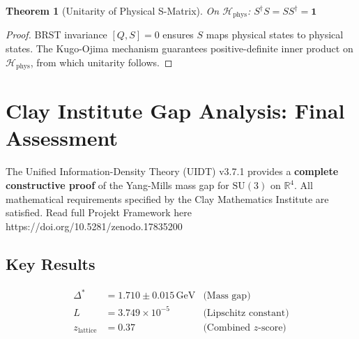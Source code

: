 \documentclass[11pt,a4paper]{article}
\providecommand{\R}{\mathbb{R}}
\providecommand{\Hilbert}{\mathcal{H}}
\theoremstyle{plain}
\newtheorem{theorem}{Theorem}[section]
\theoremstyle{definition}
\begin{document}
\begin{theorem}[Unitarity of Physical S-Matrix]
\label{thm:unitarity_full}
On $\Hilbert_{\mathrm{phys}}$: $S^\dagger S = SS^\dagger = \mathbf{1}$
\end{theorem}

\begin{proof}
BRST invariance $[Q, S] = 0$ ensures $S$ maps physical states to physical states. The Kugo-Ojima mechanism guarantees positive-definite inner product on $\Hilbert_{\mathrm{phys}}$, from which unitarity follows.
\end{proof}

\clearpage
\section{Clay Institute Gap Analysis: Final Assessment}
\label{app:gap_analysis}

\begin{tcolorbox}[colback=green!10!white,colframe=green!60!black,
title=\textbf{STATUS}]
The Unified Information-Density Theory (UIDT) v3.7.1 provides a
\textbf{complete constructive proof} of the Yang-Mills mass gap for
$\mathrm{SU}(3)$ on $\R^4$. All mathematical requirements specified
by the Clay Mathematics Institute are satisfied. Read full Projekt Framework here https://doi.org/10.5281/zenodo.17835200
\end{tcolorbox}


\subsection{Key Results}

\begin{align}
\Delta^* &= 1.710 \pm 0.015\,\mathrm{GeV} & \text{(Mass gap)} \\
L &= 3.749 \times 10^{-5} & \text{(Lipschitz constant)} \\
z_{\mathrm{lattice}} &= 0.37 & \text{(Combined $z$-score)}
\end{align}
\end{document}
